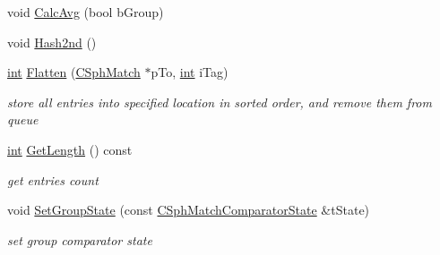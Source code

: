 \begin{DoxyCompactItemize}
void \hyperlink{classCSphKBufferNGroupSorter_a4673a6a8c6ce369922bf9a7c90dea7af}{Calc\-Avg} (bool b\-Group)
\item 
void \hyperlink{classCSphKBufferNGroupSorter_a16a5d2886a76f6a20c507687ae571c76}{Hash2nd} ()
\item 
\hyperlink{sphinxexpr_8cpp_a4a26e8f9cb8b736e0c4cbf4d16de985e}{int} \hyperlink{classCSphKBufferNGroupSorter_a6642b823c08516530afcabd4024acd99}{Flatten} (\hyperlink{classCSphMatch}{C\-Sph\-Match} $\ast$p\-To, \hyperlink{sphinxexpr_8cpp_a4a26e8f9cb8b736e0c4cbf4d16de985e}{int} i\-Tag)
\begin{DoxyCompactList}\small\item\em store all entries into specified location in sorted order, and remove them from queue \end{DoxyCompactList}\item 
\hyperlink{sphinxexpr_8cpp_a4a26e8f9cb8b736e0c4cbf4d16de985e}{int} \hyperlink{classCSphKBufferNGroupSorter_a67852a9351305dfe283ab0533db63486}{Get\-Length} () const 
\begin{DoxyCompactList}\small\item\em get entries count \end{DoxyCompactList}\item 
void \hyperlink{classCSphKBufferNGroupSorter_a99a07daed6cb5471b33a35aec58b835e}{Set\-Group\-State} (const \hyperlink{structCSphMatchComparatorState}{C\-Sph\-Match\-Comparator\-State} \&t\-State)
\begin{DoxyCompactList}\small\item\em set group comparator state \end{DoxyCompactList}\end{DoxyCompactItemize}
